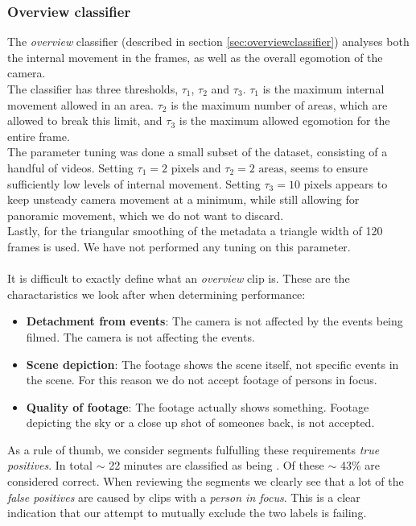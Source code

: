 \subsubsection{Overview classifier}
%
The \textit{overview} classifier (described in section \ref{sec:overviewclassifier}) analyses both the internal movement in the frames, as well as the overall egomotion of the camera.\\
The classifier has three thresholds, $\tau_{1}$, $\tau_{2}$ and $\tau_{3}$. $\tau_{1}$ is the maximum internal movement allowed in an area. $\tau_{2}$ is the maximum number of areas, which are allowed to break this limit, and $\tau_{3}$ is the maximum allowed egomotion for the entire frame.\\
The parameter tuning was done a small subset of the dataset, consisting of a handful of videos. Setting $\tau_{1} = 2 \text{ pixels}$ and $\tau_{2} = 2 \text{ areas}$, seems to ensure sufficiently low levels of internal movement. Setting $\tau_{3} = 10 \text{ pixels}$ appears to keep unsteady camera movement at a minimum, while still allowing for panoramic movement, which we do not want to discard.\\
Lastly, for the triangular smoothing of the metadata a triangle width of 120 frames is used. We have not performed any tuning on this parameter.\\
\\
It is difficult to exactly define what an \textit{overview} clip is. These are the charactaristics we look after when determining performance:
%
\begin{itemize}
	\item \textbf{Detachment from events}: The camera is not affected by the events being filmed. The camera is not affecting the events.
	\item \textbf{Scene depiction}: The footage shows the scene itself, not specific events in the scene. For this reason we do not accept footage of persons in focus.
	\item \textbf{Quality of footage}: The footage actually shows something. Footage depicting the sky or a close up shot of someones back, is not accepted.
\end{itemize}
%
As a rule of thumb, we consider segments fulfulling these requirements \textit{true positives}. In total $\sim$ 22 minutes are classified as being . Of these $\sim$ 43\% are considered correct. When reviewing the segments we clearly see that a lot of the \textit{false positives} are caused by clips with a \textit{person in focus}. This is a clear indication that our attempt to mutually exclude the two labels is failing.
%

